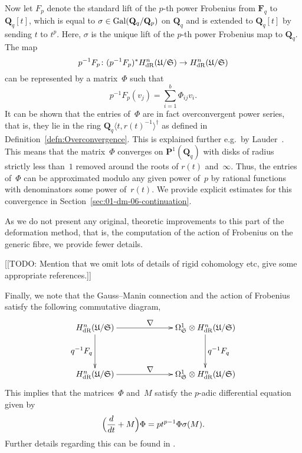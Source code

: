 Now let $F_p$ denote the standard lift of the $p$-th power Frobenius 
from $\mathbf{F}_q$ to $\mathbf{Q}_q[t]$, which is equal to 
$\sigma \in \operatorname{Gal}(\mathbf{Q}_q/\mathbf{Q}_p)$ on $\mathbf{Q}_q$ and 
is extended to $\mathbf{Q}_q[t]$ by sending $t$ to $t^p$.  Here, $\sigma$ 
is the unique lift of the $p$-th power Frobenius map to $\mathbf{Q}_q$.  
The map 
\begin{equation*}
p^{-1} F_p \colon (p^{-1} F_p)^{*} H_{\text{dR}}^{n}(\mathfrak{U}/\mathfrak{S}) 
    \rightarrow H_{\text{dR}}^{n}(\mathfrak{U}/\mathfrak{S})
\end{equation*}
can be represented by a matrix~$\Phi$ such that 
\begin{equation*}
p^{-1} F_p (v_j) = \sum_{i=1}^{b} \Phi_{ij} v_i.
\end{equation*}
It can be shown that the entries of~$\Phi$ are in fact overconvergent 
power series, that is, they lie in the ring 
$\mathbf{Q}_q\langle t, r(t)^{-1}\rangle^{\dagger}$ as defined in 
Definition~\ref{defn:Overconvergence}.  This is explained further 
e.g.\ by Lauder~\citep[\S 3.5]{Lauder2006}.  This means that the 
matrix~$\Phi$ converges on $\mathbf{P}^{1}(\mathbf{Q}_q)$ with disks 
of radius strictly less than~$1$ removed around the roots of $r(t)$ 
and~$\infty$.  Thus, the entries of~$\Phi$ can be approximated modulo 
any given power of~$p$ by rational functions with denominators some 
power of~$r(t)$.  We provide explicit estimates for this convergence 
in Section~\ref{sec:01-dm-06-continuation}.

As we do not present any original, theoretic improvements to this part of 
the deformation method, that is, the computation of the action of Frobenius 
on the generic fibre, we provide fewer details.

[[TODO:  Mention that we omit lots of details of rigid cohomology etc, 
give some appropriate references.]]

Finally, we note that the Gauss--Manin connection and the action of 
Frobenius satisfy the following commutative diagram,
\begin{equation*}
\def\labelstyle{\textstyle}
\xymatrix@C=6.8em@R=4em{
\HdR^{n}(\mathfrak{U}/\mathfrak{S}) \ar[d]_{q^{-1} F_q} \ar[r]^{\nabla} & 
\Omega_{\mathfrak{S}}^{1} \otimes \HdR^{n}(\mathfrak{U}/\mathfrak{S}) \ar[d]^{q^{-1} F_q} \\
\HdR^{n}(\mathfrak{U}/\mathfrak{S}) \ar[r]^{\nabla} & 
\Omega_{\mathfrak{S}}^{1} \otimes \HdR^{n}(\mathfrak{U}/\mathfrak{S}) 
}
\end{equation*}
This implies that the matrices~$\Phi$ and~$M$ satisfy the $p$-adic 
differential equation given by 
\begin{equation*}
\Bigl( \frac{d}{dt} + M \Bigr) \Phi = p t^{p-1} \Phi \sigma(M).
\end{equation*}
Further details regarding this can be found in \citep[\S 5]{Gerkmann2007}.


